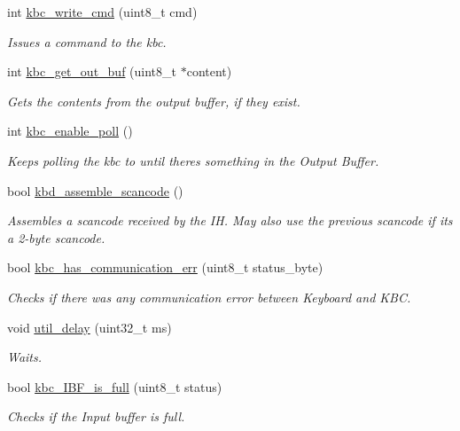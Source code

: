 \begin{DoxyCompactItemize}
int \mbox{\hyperlink{group__keyboard_gaa1dcd642657d7da0376e36cda809b0e3}{kbc\+\_\+write\+\_\+cmd}} (uint8\+\_\+t cmd)
\begin{DoxyCompactList}\small\item\em Issues a command to the kbc. \end{DoxyCompactList}\item 
int \mbox{\hyperlink{group__keyboard_gaa7f7b14e556eec81eb7b4eae1d63ec85}{kbc\+\_\+get\+\_\+out\+\_\+buf}} (uint8\+\_\+t $\ast$content)
\begin{DoxyCompactList}\small\item\em Gets the contents from the output buffer, if they exist. \end{DoxyCompactList}\item 
int \mbox{\hyperlink{group__keyboard_ga71424d3c0eee59d712469efc0f137d60}{kbc\+\_\+enable\+\_\+poll}} ()
\begin{DoxyCompactList}\small\item\em Keeps polling the kbc to until there\textquotesingle{}s something in the Output Buffer. \end{DoxyCompactList}\item 
bool \mbox{\hyperlink{group__keyboard_ga32e63cb280df583f193cbc065b0b327e}{kbd\+\_\+assemble\+\_\+scancode}} ()
\begin{DoxyCompactList}\small\item\em Assembles a scancode received by the IH. May also use the previous scancode if it\textquotesingle{}s a 2-\/byte scancode. \end{DoxyCompactList}\item 
bool \mbox{\hyperlink{group__keyboard_ga8348b9b1e74639dd7edf7e939ea2e1d1}{kbc\+\_\+has\+\_\+communication\+\_\+err}} (uint8\+\_\+t status\+\_\+byte)
\begin{DoxyCompactList}\small\item\em Checks if there was any communication error between Keyboard and K\+BC. \end{DoxyCompactList}\item 
void \mbox{\hyperlink{group__keyboard_ga686f8d95e71a43edaddda1db8b78caa4}{util\+\_\+delay}} (uint32\+\_\+t ms)
\begin{DoxyCompactList}\small\item\em Waits. \end{DoxyCompactList}\item 
bool \mbox{\hyperlink{group__keyboard_ga710a06495d4ad2c8afba84634ec89984}{kbc\+\_\+\+I\+B\+F\+\_\+is\+\_\+full}} (uint8\+\_\+t status)
\begin{DoxyCompactList}\small\item\em Checks if the Input buffer is full. \end{DoxyCompactList}\item 

\end{DoxyCompactItemize}
